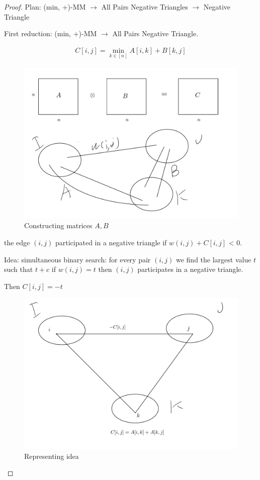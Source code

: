 \begin{proof}
	Plan: (min, +)-MM $\to$ All Pairs Negative Triangles $\to$ Negative Triangle

	First reduction: (min, +)-MM $\to$ All Pairs Negative Triangle.

	\begin{align*}
		C[i, j] = \min_{k \in [n]} A[i, k] + B[k, j]
	\end{align*}
	\begin{figure}[ht]
		\centering
		\includegraphics[scale=0.3]{figures/9.pdf}
		\caption{Constructing matrices $A, B$ }
	\end{figure}
	the edge $(i, j)$ participated in a negative triangle if $w(i, j) + C[i, j]$ < 0.

	Idea: simultaneous binary search: for every pair $(i, j)$ we find the largest value $t$ such that $t + c$ if $w(i ,j) = t$ then $(i, j)$ participates in a negative triangle.

	Then $C[i, j] = -t$
	\begin{figure}[ht]
		\centering
		\includegraphics[scale=0.3]{figures/10.pdf}
		\caption{Representing idea}
	\end{figure}


\end{proof}
